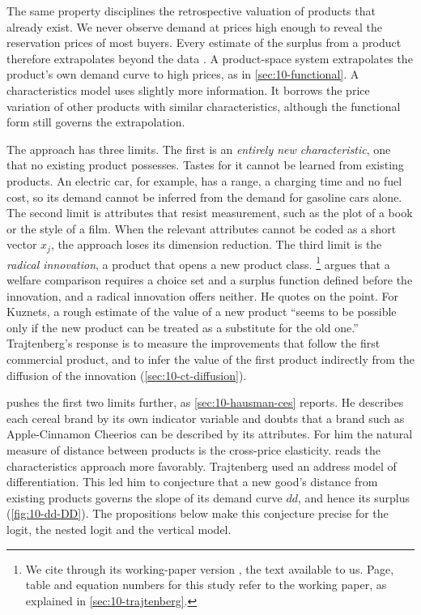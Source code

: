 The same property disciplines the retrospective valuation of products that already exist. We never observe
demand at prices high enough to reveal the reservation prices of most buyers. Every estimate of the surplus
from a product therefore extrapolates beyond the data \citep[p.~2]{BerryPakes2007}. A product-space system extrapolates the
product's own demand curve to high prices, as in \cref{sec:10-functional}. A characteristics model uses slightly
more information. It borrows the price variation of other products with similar characteristics, although the
functional form still governs the extrapolation.

The approach has three limits. The first is an \emph{entirely new characteristic}, one that no existing product
possesses. Tastes for it cannot be learned from existing products. An electric car, for example, has a range, a
charging time and no fuel cost, so its demand cannot be inferred from the demand for gasoline cars alone. The
second limit is attributes that resist measurement, such as the plot of a book or the style of a film. When the
relevant attributes cannot be coded as a short vector $x_j$, the approach loses its dimension reduction. The third
limit is the \emph{radical innovation}, a product that opens a new product class. \footnote{We cite
\citet{Trajtenberg1989} through its working-paper version \citep{Trajtenberg1985}, the text available to us. Page,
table and equation numbers for this study refer to the working paper, as explained in \cref{sec:10-trajtenberg}.}
argues that a welfare comparison requires a choice set and a surplus function defined before the innovation, and
a radical innovation offers neither. He quotes \citet[p.~28]{Kuznets1962} on the point. For Kuznets, a rough
estimate of the value of a new product ``seems to be possible only if the new product can be treated as a substitute
for the old one.''
Trajtenberg's response is to measure the improvements that follow the first commercial product, and to infer the
value of the first product indirectly from the diffusion of the innovation (\cref{sec:10-ct-diffusion}).

 pushes the first two limits further, as \cref{sec:10-hausman-ces} reports. He
describes each cereal brand by its own indicator variable and doubts that a brand such as Apple-Cinnamon Cheerios
can be described by its attributes. For him the natural measure of distance between products is the cross-price
elasticity.  reads the characteristics approach more favorably. Trajtenberg used
an address model of differentiation. This led him to conjecture that a new good's distance from existing products
governs the slope of its demand curve $dd$, and hence its surplus (\cref{fig:10-dd-DD}). The propositions below
make this conjecture precise for the logit, the nested logit and the vertical model.

